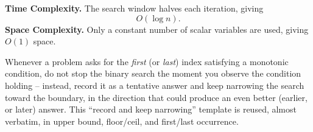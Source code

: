 \begin{complexitybox}
\textbf{Time Complexity.} The search window halves each iteration, giving
\[
  O(\log n).
\]
\textbf{Space Complexity.} Only a constant number of scalar variables are
used, giving $O(1)$ space.
\end{complexitybox}

\begin{takeawaybox}
Whenever a problem asks for the \emph{first} (or \emph{last}) index
satisfying a monotonic condition, do not stop the binary search the moment
you observe the condition holding -- instead, record it as a tentative
answer and keep narrowing the search toward the boundary, in the direction
that could produce an even better (earlier, or later) answer. This
``record and keep narrowing'' template is reused, almost verbatim, in
upper bound, floor/ceil, and first/last occurrence.
\end{takeawaybox}
